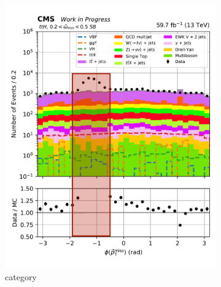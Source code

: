 \begin{figure}[htbp]
    \centering
    \begin{subfigure}[b]{0.34\textwidth}
        \includegraphics[width=\textwidth]{figures/hem_issue/sideband_4/met_phi_ttH_before_annotated.pdf}
        \caption{\ttH category}
    \end{subfigure}
    \hspace{0.05\textwidth}
    \begin{subfigure}[b]{0.34\textwidth}

\end{subfigure}
\end{figure}
